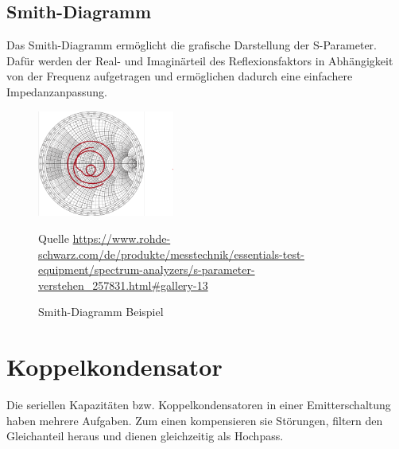 \subsection{Smith-Diagramm}
Das Smith-Diagramm ermöglicht die grafische Darstellung der S-Parameter.
Dafür werden der Real- und Imaginärteil des Reflexionsfaktors in Abhängigkeit von der Frequenz
aufgetragen und ermöglichen dadurch eine einfachere Impedanzanpassung.
\begin{figure}[h]
    \centering
    \includegraphics[width=0.4\textwidth]{Pictures/SmithDiagram.png}
    \caption{Smith-Diagramm Beispiel}
    \footnotesize{Quelle \url{https://www.rohde-schwarz.com/de/produkte/messtechnik/essentials-test-equipment/spectrum-analyzers/s-parameter-verstehen_257831.html#gallery-13}}
\end{figure}
\section{Koppelkondensator}
Die seriellen Kapazitäten bzw. Koppelkondensatoren in einer Emitterschaltung haben mehrere Aufgaben. Zum einen kompensieren sie Störungen, filtern den Gleichanteil
heraus und dienen gleichzeitig als Hochpass.
\clearpage
